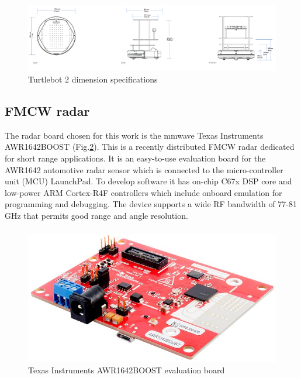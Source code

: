\begin{figure}[h] 
\centerline{\includegraphics [width=1.0 \textwidth]{imgs/chapter4/tspecs.png}}
\caption{Turtlebot 2 dimension specifications}
\label{fig:t2specs}
\end{figure}


\subsection{FMCW radar}

The radar board chosen for this work is the mmwave Texas Instruments AWR1642BOOST (Fig.\ref{fig:awr}). This is a recently distributed \ac{FMCW} radar dedicated for short range applications. It is an easy-to-use evaluation board for the AWR1642 automotive radar sensor which is connected to the micro-controller unit (MCU) LaunchPad. To develop software it has  on-chip C67x DSP core and low-power ARM Cortex-R4F controllers which include onboard emulation for programming and debugging. The device supports a wide RF bandwidth of 77-81 GHz that permits good range and angle resolution.
\subsubsection*{}

\begin{figure}[h] 
\centerline{\includegraphics [width=0.5 \textwidth]{imgs/chapter4/awr1642.jpg}}
\caption{Texas Instruments AWR1642BOOST evaluation board}
\label{fig:awr}
\end{figure}

